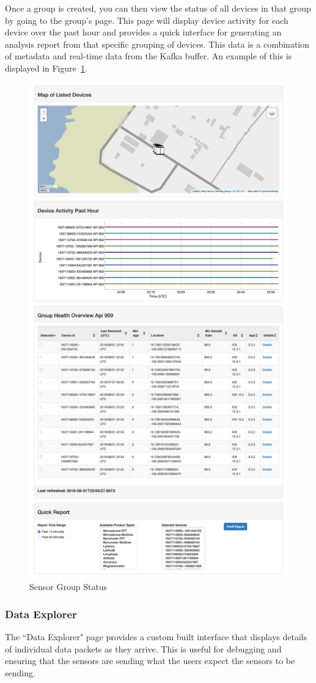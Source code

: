 Once a group is created, you can then view the status of all devices in that group by going to the group's page. This page will display device activity for each device over the past hour and provides a quick interface for generating an analysis report from that specific grouping of devices. This data is a combination of metadata and real-time data from the Kafka buffer. An example of this is displayed in Figure~\ref{fig:lweb_group}.

\begin{figure}
	\centering
	\includegraphics[width=0.65\linewidth]{figures/lweb_group.png}
	\caption{Sensor Group Status}
	\label{fig:lweb_group}
\end{figure}

\subsubsection{Data Explorer}
The ``Data Explorer" page provides a custom built interface that displays details of individual data packets as they arrive. This is useful for debugging and ensuring that the sensors are sending what the users expect the sensors to be sending.

